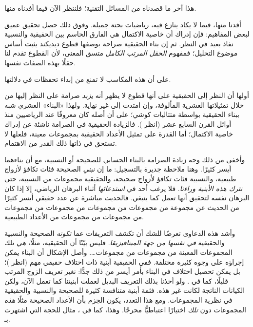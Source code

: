 \documentclass[../../../include/open-logic-section]{subfiles}
\begin{document}

هذا آخر ما قصدناه من المسائل التقنية؛ فلننظر الآن فيما أفدناه منها.

أفدنا منها، فيما لا يكاد ينازع فيه، رياضيات بحتة {جميلة}. وفوق ذلك حصل تحقيق عميق لبعض المفاهيم: فإن إدراك أن خاصية الاكتمال هي الفارق الحاسم بين الحقيقية والنسبية نفاذ بعيد في النظر. ثم إن بناء الحقيقية صراحة بوصفها قطوع ديديكند يثبت أساس موضوع التحليل؛ فمفهوم \emph{الحقل المرتب الكامل} متسق المعنى، لأن القطوع تقدم لنا حقلًا بهذه الصفات نفسها.

على أن هذه المكاسب لا تمنع من إبداء تحفظات في دلالتها.

أولها أن النظر إلى الحقيقية على أنها قطوع لا يظهر أنه \emph{يزيد} صرامة على النظر إليها من خلال تمثيلاتها العشرية المألوفة، وإن امتدت إلى غير نهاية. ولهذا «البناء» العشري شبه ببناء الحقيقية بواسطة متتاليات كوشي؛ على أن أصله كان معروفًا عند الرياضيين منذ أوائل القرن السابع عشر (انظر ). فالزيادة الحقيقية في الصرامة ناشئة عن إدراك خاصية الاكتمال؛ أما القدرة على تمثيل الأعداد الحقيقية بمجموعات معينة، فلعلها لا تستحق في ذاتها ذلك القدر من الاهتمام.

وأخفى من ذلك وجه زيادة الصرامة بالبناء الحسابي للصحيحة أو النسبية، مع أن بناءهما أيسر كثيرًا. وهنا ملاحظة جديرة بالتسجيل: ما إن \emph{نبني} الصحيحة فئات تكافؤ لأزواج طبيعية، والنسبية فئات تكافؤ لأزواج صحيحة، والحقيقية مجموعات من النسبية، حتى \emph{نترك هذه الأبنية وراءنا}. فلا يرغب أحد في \emph{استدعائها} أثناء البرهان الرياضي، إلا إذا كان البرهان نفسه لتحقيق أنها تعمل كما ينبغي. فالحديث مباشرة عن عدد حقيقي أيسر كثيرًا من الحديث عن مجموعة من مجموعات من مجموعات من مجموعات من مجموعات من مجموعات من مجموعات من الأعداد الطبيعية.
%
%
%

وأشد هذه الدعاوى تعرضًا للشك أن تكشف التعريفات عما \emph{تكونه} الصحيحة والنسبية والحقيقية \emph{في نفسها من جهة الميتافيزيقا}. فليس بيّنًا أن الحقيقية، مثلًا، \emph{هي} تلك المجموعات المعينة من مجموعات من مجموعات\ldots. وأصل الإشكال أن البناء يمكن إجراؤه على وجوه كثيرة مختلفة. ففي الحقيقية أبنية ذات اختلاف حقيقي مهم (انظر )؛ بل يمكن تحصيل اختلاف في البناء بأمر أيسر من ذلك جدًّا: نغير تعريف الزوج المرتب قليلًا، كما في . ولو أخذنا بذلك التعريف البديل لعملت أبنيتنا كما تعمل الآن، ولكن الكيانات الناتجة لكانت غير هذه. فثمة أبنية متنافسة كثيرة للصحيحة والنسبية والحقيقية في نظرية المجموعات. ومع هذا التعدد، يكون الجزم بأن الأعداد الصحيحة مثلًا \emph{هذه} المجموعات دون \emph{تلك} اختيارًا اعتباطيًّا محرجًا. وهذا، كما في ، مثال للحجة التي اشتهرت بـ\citealt{Benacerraf1965}.
\end{document}

